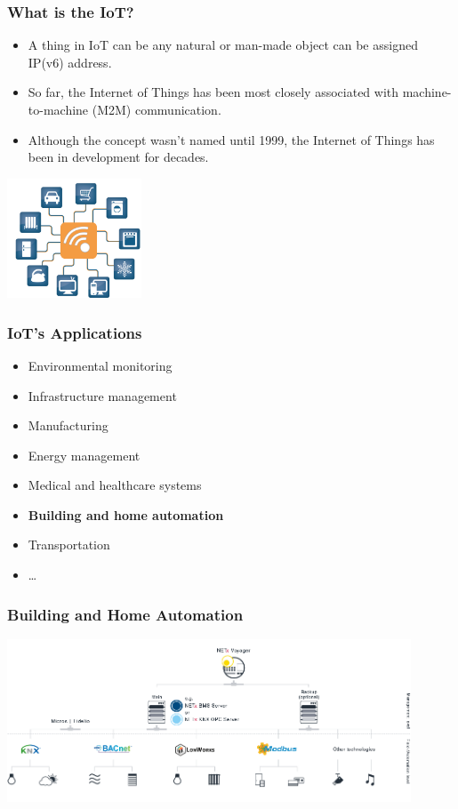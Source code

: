\documentclass{beamer}
\begin{document}
\begin{frame}
	\frametitle{What is the IoT?}
	\begin{itemize}
		\justifying
		\item A \textcolor{TextGreen}{thing} in IoT can be any natural or man-made object can be assigned \textcolor{TextGreen}{IP(v6) address}.
		\item So far, the Internet of Things has been most closely associated with machine-to-machine (M2M) communication.
		\item Although the concept wasn't named until 1999, the Internet of Things has been in development for decades.
		\end{itemize}
	\vspace{.5cm}
	\hspace*{7cm}\includegraphics[width=4cm]{figs/Internet-of-Things-4.jpg}
\end{frame}

\begin{frame}
	\frametitle{IoT's Applications}
	\begin{itemize}
		\item Environmental monitoring
		\item Infrastructure management
		\item Manufacturing
		\item Energy management
		\item Medical and healthcare systems
		\item \textcolor{TextGreen}{\textbf{Building and home automation}}
		\item Transportation
		\item \ldots
	\end{itemize}
\end{frame}

\begin{frame}
	\frametitle{Building and Home Automation}
	\includegraphics[width=12cm]{figs/voyager-concept.png}
\end{frame}
\end{document}
